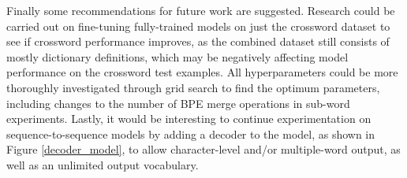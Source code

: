 \documentclass[11pt]{article}
\begin{document}
\begin{spacing}{1}
Finally some recommendations for future work are suggested. Research could be carried out on fine-tuning fully-trained models on just the crossword dataset to see if crossword performance improves, as the combined dataset still consists of mostly dictionary definitions, which may be negatively affecting model performance on the crossword test examples. All hyperparameters could be more thoroughly investigated through grid search to find the optimum parameters, including changes to the number of BPE merge operations in sub-word experiments. Lastly, it would be interesting to continue experimentation on sequence-to-sequence models by adding a decoder to the model, as shown in Figure \ref{decoder_model}, to allow character-level and/or multiple-word output, as well as an unlimited output vocabulary. 




\newpage


\end{spacing}
\end{document}
